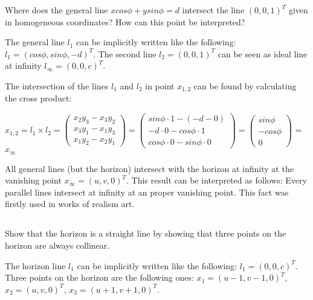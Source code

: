 \documentclass[a4paper,headings=small]{scrartcl}
\numberwithin{equation}{section} %
\numberwithin{figure}{section}   %
\begin{document}
Where does the general line $ x cos \phi + y sin \phi = d$ intersect the line $(0, 0, 1)^T$
given in homogeneous coordinates? \newline
How can this point be interpreted? \newline

The general line $l_1$ can be implicitly written like the following: $l_1=(cos \phi, sin \phi, -d)^T$. \newline
The second line $l_{2}=(0, 0, 1)^T$ can be seen as ideal line at infinity $l_{\infty}=(0, 0, c)^T$.

The intersection of the lines $l_1$ and $l_2$ in point $x_{1,2}$ can be found by calculating the cross product:

$x_{1,2}=l_1 \times l_2=
\left( \begin{array}{c}
x_2y_3-x_3y_2\\
x_3y_1-x_1y_3\\
x_1y_2-x_2y_1\end{array} \right)=
\left( \begin{array}{c}
sin \phi \cdot 1-(-d-0)\\
-d \cdot 0-cos \phi \cdot 1\\
cos \phi \cdot 0-sin \phi \cdot 0\end{array} \right)=
\left( \begin{array}{c}
sin \phi\\
-cos \phi\\
0\end{array} \right)$ = $x_{\infty}$ \newline

All general lines (but the horizon) intersect with the horizon at infinity 
at the vanishing point $x_{\infty}=(u,v,0)^T$. This result can be interpreted as follows:
Every parallel lines intersect at infinity at an proper vanishing point.
This fact was firstly used in works of realism art.

\subsection{}

Show that the horizon is a straight line by showing that three points
on the horizon are always collinear. \newline

The horizon line $l_1$ can be implicitly written like the following: $l_1=(0, 0, c)^T$. \newline
Three points on the horizon are the following ones: \newline
$x_{1}=(u-1,v-1,0)^T$, \newline
$x_{2}=(u,v,0)^T$, \newline
$x_{3}=(u+1,v+1,0)^T$. \newline
\end{document}
